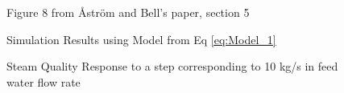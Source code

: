         \begin{figure}[ht]
            \begin{center}
                
                Figure 8 from \r{A}str\"{o}m and Bell's paper, section 5 \cite{Astrom}
                
                
                Simulation Results using Model from Eq \eqref{eq:Model_1}
                
                \caption{Steam Quality Response to a step corresponding to 10 kg/s in feed water flow rate}
                \label{fig:Fig8F}
                
            \end{center}
        \end{figure}  %
        
